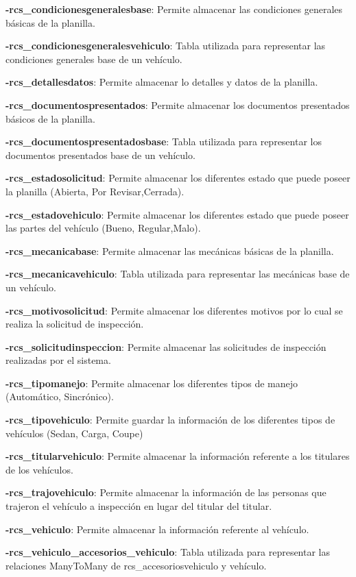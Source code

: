 \textbf{-rcs\_condicionesgeneralesbase}: Permite almacenar las condiciones generales básicas de la planilla.

\textbf{-rcs\_condicionesgeneralesvehiculo}: Tabla utilizada para representar las condiciones generales base de un vehículo.

\textbf{-rcs\_detallesdatos}: Permite almacenar lo detalles y datos de la planilla.

\textbf{-rcs\_documentospresentados}: Permite almacenar los documentos presentados básicos de la planilla.

\textbf{-rcs\_documentospresentadosbase}: Tabla utilizada para representar los documentos presentados base de un vehículo.

\textbf{-rcs\_estadosolicitud}: Permite almacenar los diferentes estado que puede poseer la planilla (Abierta, Por Revisar,Cerrada).

\textbf{-rcs\_estadovehiculo}: Permite almacenar los diferentes estado que puede poseer las partes del vehículo (Bueno, Regular,Malo).

\textbf{-rcs\_mecanicabase}: Permite almacenar las mecánicas básicas de la planilla.

\textbf{-rcs\_mecanicavehiculo}: Tabla utilizada para representar las mecánicas base de un vehículo.

\textbf{-rcs\_motivosolicitud}: Permite almacenar los diferentes motivos por lo cual se realiza la solicitud de inspección.

\textbf{-rcs\_solicitudinspeccion}: Permite almacenar las solicitudes de inspección realizadas por el sistema.

\textbf{-rcs\_tipomanejo}: Permite almacenar los diferentes tipos de manejo (Automático, Sincrónico).

\textbf{-rcs\_tipovehiculo}: Permite guardar la información de los diferentes tipos de vehículos (Sedan, Carga, Coupe)

\textbf{-rcs\_titularvehiculo}: Permite almacenar la información referente a los titulares de los vehículos.

\textbf{-rcs\_trajovehiculo}: Permite almacenar la información de las personas que trajeron el vehículo a inspección en lugar del titular del titular.

\textbf{-rcs\_vehiculo}: Permite almacenar la información referente al vehículo.

\textbf{-rcs\_vehiculo\_accesorios\_vehiculo}: Tabla utilizada para representar las relaciones ManyToMany de rcs\_accesoriosvehiculo y vehículo.

